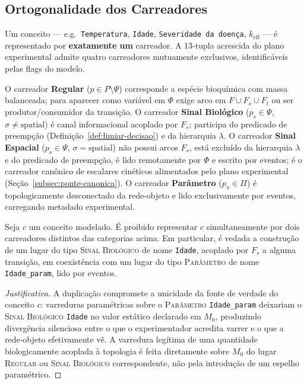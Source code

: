\subsection{Ortogonalidade dos Carreadores}
\label{subsec:ortogonalidade-carreadores}

Um conceito --- e.g.\ \texttt{Temperatura}, \texttt{Idade},
\texttt{Severidade da doença}, $k_{\text{eff}}$ --- é representado por
\textbf{exatamente um} carreador. A 13-tupla acrescida do plano experimental
admite quatro carreadores mutuamente exclusivos, identificáveis pelas
flags do modelo.

O carreador \textbf{Regular} ($p \in P \setminus \Psi$) corresponde a espécie
bioquímica com massa balanceada; para aparecer como variável em $\Phi$ exige
arco em $F \cup F_s \cup F_t$ ou ser produtor/consumidor da transição.
O carreador \textbf{Sinal Biológico} ($p_s \in \Psi$,
$\sigma \neq \text{spatial}$) é canal informacional acoplado por $F_s$;
participa do predicado de preempção (Definição~\ref{def:limiar-decisao}) e da
hierarquia $\lambda$.
O carreador \textbf{Sinal Espacial} ($p_s \in \Psi$,
$\sigma = \text{spatial}$) não possui arcos $F_s$, está excluído da hierarquia
$\lambda$ e do predicado de preempção, é lido remotamente por $\Phi$ e escrito
por eventos; é o carreador canônico de escalares cinéticos alimentados pelo
plano experimental (Seção~\ref{subsec:ponte-canonica}).
O carreador \textbf{Parâmetro} ($p_\pi \in \Pi$) é topologicamente
desconectado da rede-objeto e lido exclusivamente por eventos, carregando
metadado experimental.

\begin{lemma}
\label{lemma:mutua-exclusao}
Seja $c$ um conceito modelado. É proibido representar $c$ simultaneamente por
dois carreadores distintos das categorias acima. Em particular, é vedada a
construção de um lugar do tipo \textsc{Sinal Biológico} de nome
\texttt{Idade}, acoplado por $F_s$ a alguma transição, em coexistência com
um lugar do tipo \textsc{Parâmetro} de nome \texttt{Idade\_param}, lido por
eventos.
\end{lemma}

\begin{proof}[Justificativa]
A duplicação compromete a unicidade da fonte de verdade do conceito $c$:
varreduras paramétricas sobre o \textsc{Parâmetro} \texttt{Idade\_param}
deixariam o \textsc{Sinal Biológico} \texttt{Idade} no valor estático
declarado em $M_0$, produzindo divergência silenciosa entre o que o
experimentador acredita varrer e o que a rede-objeto efetivamente vê. A
varredura legítima de uma quantidade biologicamente acoplada à topologia é
feita diretamente sobre $M_0$ do lugar \textsc{Regular} ou \textsc{Sinal
Biológico} correspondente, não pela introdução de um espelho paramétrico.
\end{proof}

